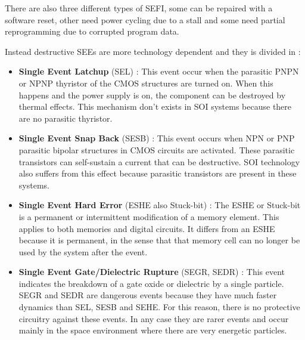{{{{{\begin{itemize}
						There are also three different types of SEFI, some can be repaired with a software reset, other need power cycling due to a stall and some need partial reprogramming due to corrupted program data.
						
					\end{itemize}
					
					
					
					
					Instead destructive SEEs are more technology dependent and they is divided in :
					\begin{itemize}
						\item \textbf{Single Event Latchup} (SEL) : This event occur when the parasitic PNPN or NPNP thyristor of the CMOS structures are turned on. When this happens and the power supply is on, the component can be destroyed by thermal effects. This mechanism don't exists in SOI systems because there are no parasitic thyristor.
						
						\item \textbf{Single Event Snap Back} (SESB) : This event occurs when NPN or PNP parasitic bipolar structures in CMOS circuits are activated. These parasitic transistors can self-sustain a current that can be destructive. SOI technology also suffers from this effect because parasitic transistors are present in these systems. 
						
						\item \textbf{Single Event Hard Error} (ESHE also Stuck-bit) : The ESHE or Stuck-bit is a permanent or intermittent modification of a memory element. This applies to both memories and digital circuits. It differs from an ESHE because it is permanent, in the sense that that memory cell can no longer be used by the system after the event.
						
						\item \textbf{Single Event Gate/Dielectric Rupture} (SEGR, SEDR) : This event indicates the breakdown of a gate oxide or dielectric by a single particle. SEGR and SEDR are dangerous events because they have much faster dynamics than SEL, SESB and SEHE. For this reason, there is no protective circuitry against these events.  In any case they are rarer events and occur mainly in the space environment where there are very energetic particles. 
					\end{itemize} 
					
				} %
			}%
		}%
			
		\newpage
}}
